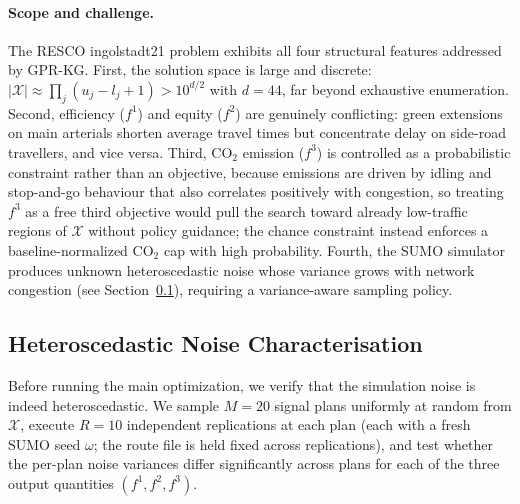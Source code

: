 \documentclass[12pt]{article}
\theoremstyle{plain}
\theoremstyle{definition}
\theoremstyle{remark}
\begin{document}
\paragraph{Scope and challenge.}
The RESCO ingolstadt21 problem exhibits all four structural features addressed by
GPR-KG.  First, the solution space is large and discrete:
$|\mathcal{X}|\approx\prod_{j}(u_{j}-l_{j}+1) > 10^{d/2}$ with $d=44$,
far beyond exhaustive enumeration.  Second, efficiency ($f^{1}$) and
equity ($f^{2}$) are genuinely conflicting: green extensions on main
arterials shorten average travel times but concentrate delay on
side-road travellers, and vice versa.  Third, CO$_{2}$ emission
($f^{3}$) is controlled as a probabilistic constraint rather than an
objective, because emissions are driven by idling and stop-and-go
behaviour that also correlates positively with congestion, so treating
$f^{3}$ as a free third objective would pull the search toward already
low-traffic regions of $\mathcal{X}$ without policy guidance; the
chance constraint instead enforces a baseline-normalized CO$_{2}$ cap
with high probability.  Fourth, the SUMO simulator produces unknown
heteroscedastic noise whose variance grows with network congestion
(see Section~\ref{subsec:case_hetero}), requiring a variance-aware
sampling policy.


\subsection{Heteroscedastic Noise Characterisation}\label{subsec:case_hetero}

Before running the main optimization, we verify that the simulation
noise is indeed heteroscedastic.  We sample $M=20$ signal plans
uniformly at random from $\mathcal{X}$, execute $R=10$ independent
replications at each plan (each with a fresh SUMO seed $\omega$; the
route file is held fixed across replications), and test
whether the per-plan noise variances differ significantly across plans
for each of the three output quantities $(f^{1},f^{2},f^{3})$.
\end{document}
